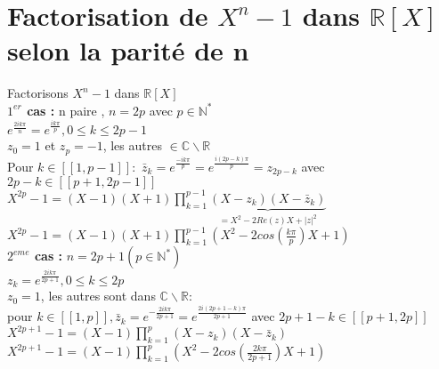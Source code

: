 \documentclass{article}
\begin{document}
\section{Factorisation de $X^n-1$ dans $\mathbb R [X]$ selon la parité de n}
Factorisons $X^n-1$ dans $\mathbb R [X]$ \\
{\bf \boldmath $1^{er}$ cas :} n paire , $n=2p$ avec $ p \in \mathbb N^*$ \\
$e^{\frac{2ik\pi}{n}}=e^{\frac{ik\pi}{p}}, 0 \leq k \leq 2p-1$ \\
$z_0=1$ et $z_p=-1$, les autres $\in \mathbb C \backslash \mathbb R$ \\
Pour $k \in [[1,p-1]]:$ $\bar{z}_k=e^{\frac{-ik\pi}{p}}=e^{\frac{i(2p-k)\pi}{p}}=z_{2p-k}$ avec $2p-k \in [[p+1,2p-1]]$ \\
$X^{2p}-1=(X-1)(X+1)\prod_{k=1}^{p-1}\underbrace{(X-z_k)(X-\bar{z}_k)}_{=X^2-2Re(z)X+|z|^2}$ \\
$X^{2p}-1=(X-1)(X+1) \prod_{k=1}^{p-1}(X^2-2cos(\frac{k\pi}{p})X+1)$ \\
{\bf \boldmath $2^{eme}$ cas :} $n=2p+1 (p \in \mathbb N^*)$ \\
$z_k=e^{\frac{2ik\pi}{2p+1}},0 \leq k \leq 2p $ \\
$z_0=1$, les autres sont dans $\mathbb C \backslash \mathbb R$: \\
pour $k \in [[1,p]], \bar{z}_k=e^{-\frac{2ik\pi}{2p+1}}=e^{\frac{2i(2p+1-k)\pi}{2p+1}}$ avec $2p+1-k \in [[p+1,2p]]$ \\
$X^{2p+1}-1=(X-1) \prod_{k=1}^p (X-z_k)(X-\bar{z}_k)$ \\
$X^{2p+1}-1=(X-1) \prod_{k=1}^p (X^2-2cos(\frac{2k\pi}{2p+1})X+1)$
\end{document}
